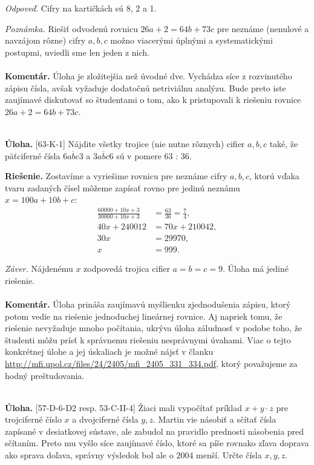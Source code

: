 \documentclass[11pt,a4paper,oneside,final]{book}
\newcommand{\kom}{\textbf{Komentár.} }
\newcommand{\ul}{\textbf{Úloha.} }
\newcommand{\rie}{\textbf{Riešenie.} }
\begin{document}
\textit{Odpoveď.} Cifry na kartičkách sú 8, 2 a 1.

\textit{Poznámka.} Riešiť odvodenú rovnicu $26a + 2 = 64b + 73c$ pre neznáme (nenulové a navzájom rôzne) cifry $a, b, c$ možno viacerými úplnými a systematickými postupmi, uviedli sme len jeden z nich.\\
\\
\kom Úloha je zložitejšia než úvodné dve. Vychádza síce z rozvinutého zápisu čísla, avšak vyžaduje dodatočnú netriviálnu analýzu. Bude preto iste zaujímavé diskutovať so študentami o tom, ako k pristupovali k riešeniu rovnice $26a + 2 = 64b + 73c$. \\
\\
\begin{tcolorbox}[breakable,notitle,boxrule=0pt,colback=light-gray,colframe=light-gray]\ul [63-K-1]
Nájdite všetky trojice (nie nutne rôznych) cifier $a, b, c$ také, že päťciferné čísla $\overline{6abc3}$ a $\overline{3abc6}$ sú v pomere 63 : 36.

\end{tcolorbox}

\rie Zostavíme a vyriešime rovnicu pre neznáme cifry $a, b, c$, ktorú vďaka tvaru zadaných čísel môžeme zapísať rovno pre jedinú neznámu $x = 100a + 10b + c$:
\begin{align*}
\frac{60000+10x+3}{30000+10x+3} &=\frac{63}{36}=\frac{7}{4},\\
40x + 240 012 &= 70x + 210 042,\\
30x &= 29 970,\\
x &= 999.
\end{align*}

\textit{Záver.} Nájdenému $x$ zodpovedá trojica cifier $a = b = c = 9$. Úloha má jediné riešenie.\\
\\
\kom Úloha prináša zaujímavú myšlienku zjednodušenia zápisu, ktorý potom vedie na riešenie jednoduchej lineárnej rovnice. Aj napriek tomu, že riešenie nevyžaduje mnoho počítania, ukrýva úloha záludnosť v podobe toho, že študenti môžu prísť k správnemu riešeniu nesprávnymi úvahami. Viac o tejto konkrétnej úlohe a jej úskaliach je možné nájsť v članku \url{http://mfi.upol.cz/files/24/2405/mfi_2405_331_334.pdf}, ktorý považujeme za hodný preštudovania.\\
\\
\begin{tcolorbox}[breakable,notitle,boxrule=0pt,colback=light-gray,colframe=light-gray]\ul [57-D-6-D2 resp. 53-C-II-4]  Žiaci mali vypočítať príklad $x + y \cdot z$ pre trojciferné číslo $x$ a dvojciferné čísla $y, z$. Martin vie násobiť a sčítať čísla zapísané v desiatkovej sústave, ale zabudol na pravidlo prednosti násobenia pred sčítaním. Preto mu vyšlo síce zaujímavé číslo, ktoré sa píše rovnako zľava doprava ako sprava doľava, správny výsledok bol ale o $2 004$ menší. Určte čísla $x, y, z$.

\end{tcolorbox}
\end{document}
